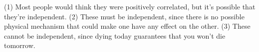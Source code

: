 (1) Most people would think they were positively correlated, but it's possible that
they're independent.
 (2) These must be independent, since 
there is no possible physical mechanism that could make one have any effect on the other.
 (3) These cannot be independent, since dying today guarantees that you won't die tomorrow.
